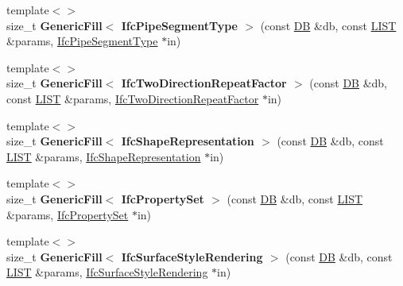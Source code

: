 \begin{DoxyCompactItemize}
\item 
\hypertarget{namespace_assimp_1_1_s_t_e_p_aedf6058591772dbfd9c592fac1f121a1}{{\footnotesize template$<$$>$ }\\size\+\_\+t {\bfseries Generic\+Fill$<$ Ifc\+Pipe\+Segment\+Type $>$} (const \hyperlink{class_assimp_1_1_s_t_e_p_1_1_d_b}{D\+B} \&db, const \hyperlink{class_assimp_1_1_s_t_e_p_1_1_e_x_p_r_e_s_s_1_1_l_i_s_t}{L\+I\+S\+T} \&params, \hyperlink{struct_assimp_1_1_i_f_c_1_1_ifc_pipe_segment_type}{Ifc\+Pipe\+Segment\+Type} $\ast$in)}\label{namespace_assimp_1_1_s_t_e_p_aedf6058591772dbfd9c592fac1f121a1}

\item 
\hypertarget{namespace_assimp_1_1_s_t_e_p_ab010b010a92826597e6f2186cb8c8f45}{{\footnotesize template$<$$>$ }\\size\+\_\+t {\bfseries Generic\+Fill$<$ Ifc\+Two\+Direction\+Repeat\+Factor $>$} (const \hyperlink{class_assimp_1_1_s_t_e_p_1_1_d_b}{D\+B} \&db, const \hyperlink{class_assimp_1_1_s_t_e_p_1_1_e_x_p_r_e_s_s_1_1_l_i_s_t}{L\+I\+S\+T} \&params, \hyperlink{struct_assimp_1_1_i_f_c_1_1_ifc_two_direction_repeat_factor}{Ifc\+Two\+Direction\+Repeat\+Factor} $\ast$in)}\label{namespace_assimp_1_1_s_t_e_p_ab010b010a92826597e6f2186cb8c8f45}

\item 
\hypertarget{namespace_assimp_1_1_s_t_e_p_a1fef2a5daa802b741d4595717f2d9ca8}{{\footnotesize template$<$$>$ }\\size\+\_\+t {\bfseries Generic\+Fill$<$ Ifc\+Shape\+Representation $>$} (const \hyperlink{class_assimp_1_1_s_t_e_p_1_1_d_b}{D\+B} \&db, const \hyperlink{class_assimp_1_1_s_t_e_p_1_1_e_x_p_r_e_s_s_1_1_l_i_s_t}{L\+I\+S\+T} \&params, \hyperlink{struct_assimp_1_1_i_f_c_1_1_ifc_shape_representation}{Ifc\+Shape\+Representation} $\ast$in)}\label{namespace_assimp_1_1_s_t_e_p_a1fef2a5daa802b741d4595717f2d9ca8}

\item 
\hypertarget{namespace_assimp_1_1_s_t_e_p_ad7277077db3bc00362f38cad6207c298}{{\footnotesize template$<$$>$ }\\size\+\_\+t {\bfseries Generic\+Fill$<$ Ifc\+Property\+Set $>$} (const \hyperlink{class_assimp_1_1_s_t_e_p_1_1_d_b}{D\+B} \&db, const \hyperlink{class_assimp_1_1_s_t_e_p_1_1_e_x_p_r_e_s_s_1_1_l_i_s_t}{L\+I\+S\+T} \&params, \hyperlink{struct_assimp_1_1_i_f_c_1_1_ifc_property_set}{Ifc\+Property\+Set} $\ast$in)}\label{namespace_assimp_1_1_s_t_e_p_ad7277077db3bc00362f38cad6207c298}

\item 
\hypertarget{namespace_assimp_1_1_s_t_e_p_a3c89ce23d7f456bd58975168d4c823f7}{{\footnotesize template$<$$>$ }\\size\+\_\+t {\bfseries Generic\+Fill$<$ Ifc\+Surface\+Style\+Rendering $>$} (const \hyperlink{class_assimp_1_1_s_t_e_p_1_1_d_b}{D\+B} \&db, const \hyperlink{class_assimp_1_1_s_t_e_p_1_1_e_x_p_r_e_s_s_1_1_l_i_s_t}{L\+I\+S\+T} \&params, \hyperlink{struct_assimp_1_1_i_f_c_1_1_ifc_surface_style_rendering}{Ifc\+Surface\+Style\+Rendering} $\ast$in)}\label{namespace_assimp_1_1_s_t_e_p_a3c89ce23d7f456bd58975168d4c823f7}


\end{DoxyCompactItemize}
